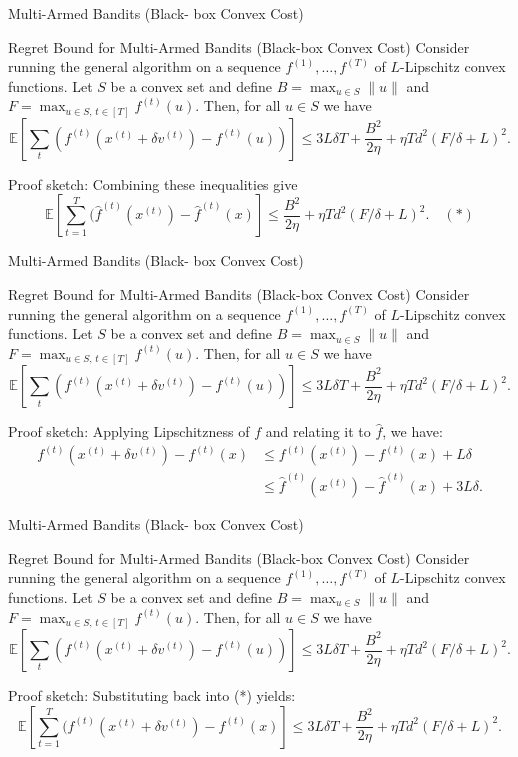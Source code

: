 \begin{frame}{Multi-Armed Bandits (Black- box Convex Cost)}
\small
\begin{block}{Regret Bound for Multi-Armed Bandits (Black-box Convex Cost)}
    Consider running the general algorithm on a
    sequence $f^{(1)}, \ldots, f^{(T)}$ of $L$-Lipschitz convex functions. Let $S$ be a
    convex set and define $B = \max_{u \in S} \|u\|$ and
    $F = \max_{u \in S,\, t \in [T]} f^{(t)}(u)$. Then, for all $u \in S$ we have
    $$
    \mathbb{E}\left[\sum_t \left(f^{(t)}(x^{(t)} + \delta v^{(t)}) - f^{(t)}(u)\right)\right]
    \leq 3L\delta T + \frac{B^2}{2\eta} + \eta T d^2 (F/\delta + L)^2.
    $$
\end{block}
Proof sketch:
Combining these inequalities give
$$ \mathbb{E}\left[\sum_{t=1}^T (\hat{f}^{(t)}(x^{(t)}) - \hat{f}^{(t)}(x) \right] \leq \frac{B^2}{2\eta} + \eta T d^2 (F/\delta + L)^2. \quad (*) $$
\end{frame}

\begin{frame}{Multi-Armed Bandits (Black- box Convex Cost)}
\small
\begin{block}{Regret Bound for Multi-Armed Bandits (Black-box Convex Cost)}
    Consider running the general algorithm on a
    sequence $f^{(1)}, \ldots, f^{(T)}$ of $L$-Lipschitz convex functions. Let $S$ be a
    convex set and define $B = \max_{u \in S} \|u\|$ and
    $F = \max_{u \in S,\, t \in [T]} f^{(t)}(u)$. Then, for all $u \in S$ we have
    $$
    \mathbb{E}\left[\sum_t \left(f^{(t)}(x^{(t)} + \delta v^{(t)}) - f^{(t)}(u)\right)\right]
    \leq 3L\delta T + \frac{B^2}{2\eta} + \eta T d^2 (F/\delta + L)^2.
    $$
\end{block}
Proof sketch:
Applying Lipschitzness of $f$ and relating it to $\hat{f}$, we have:
\begin{align*}
    f^{(t)}(x^{(t)} + \delta v^{(t)}) - f^{(t)}(x) &\leq f^{(t)}(x^{(t)}) - f^{(t)}(x) + L \delta \\
    &\leq \hat{f}^{(t)}(x^{(t)}) - \hat{f}^{(t)}(x) + 3L\delta.
\end{align*}
\end{frame}



\begin{frame}{Multi-Armed Bandits (Black- box Convex Cost)}
\small
\begin{block}{Regret Bound for Multi-Armed Bandits (Black-box Convex Cost)}
    Consider running the general algorithm on a
    sequence $f^{(1)}, \ldots, f^{(T)}$ of $L$-Lipschitz convex functions. Let $S$ be a
    convex set and define $B = \max_{u \in S} \|u\|$ and
    $F = \max_{u \in S,\, t \in [T]} f^{(t)}(u)$. Then, for all $u \in S$ we have
    $$
    \mathbb{E}\left[\sum_t \left(f^{(t)}(x^{(t)} + \delta v^{(t)}) - f^{(t)}(u)\right)\right]
    \leq 3L\delta T + \frac{B^2}{2\eta} + \eta T d^2 (F/\delta + L)^2.
    $$
\end{block}
Proof sketch:
Substituting back into (*) yields:
$$ \mathbb{E}\left[\sum_{t=1}^T (f^{(t)}(x^{(t)} +\delta v^{(t)} ) - f^{(t)}(x) \right] \leq 3L\delta T + \frac{B^2}{2\eta} + \eta T d^2 (F/\delta + L)^2.$$
\end{frame}

